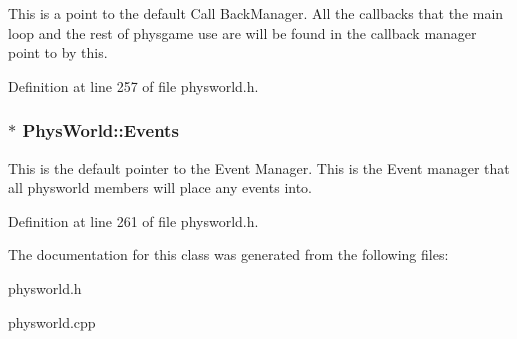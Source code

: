 This is a point to the default Call BackManager. All the callbacks that the main loop and the rest of physgame use are will be found in the callback manager point to by this. 

Definition at line 257 of file physworld.h.\hypertarget{classPhysWorld_a601b3c6093aaf2a69fcd3311dde9aadc}{
\subsubsection[{Events}]{$\ast$ {\bf PhysWorld::Events}}}
\label{db/df5/classPhysWorld_a601b3c6093aaf2a69fcd3311dde9aadc}


This is the default pointer to the Event Manager. This is the Event manager that all physworld members will place any events into. 

Definition at line 261 of file physworld.h.

The documentation for this class was generated from the following files:\begin{DoxyCompactItemize}
\item 
physworld.h\item 
physworld.cpp\end{DoxyCompactItemize}
